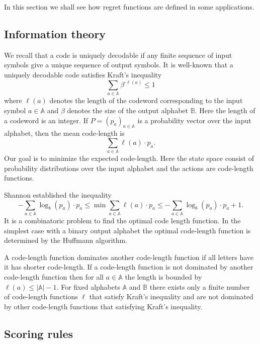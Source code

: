 \documentclass[10pt,a4paper,draft]{article}
\begin{document}
In this section we shall see how regret functions are defined in some applications.

\subsection{Information theory}

We recall that a code is uniquely decodable if any finite
sequence of input symbols give a unique sequence of output symbols. It is
well-known that a uniquely decodable code satisfies Kraft's inequality 
\begin{equation}
\sum_{a\in\mathbb{A}}\beta^{\textrm{-}\ell\left(a\right)}\leq1\label{eq:Kraft}
\end{equation}
where $\ell\left(a\right)$ denotes the length of the codeword
corresponding to the input symbol $a\in\mathbb{A}$ and $\beta$ denotes the
size of the output alphabet $\mathbb{B}$. Here the length of a codeword is an integer. If $P=\left(p_{a}\right)_{a\in\mathbb{A}}$ is a probability vector over the input alphabet, then the mean
code-length is 
\[
\sum_{a\in\mathbb{A}}\ell\left(a\right)\cdot p_{a}.
\]
Our goal is to minimize the expected code-length. Here the state
space consist of probability distributions over the input
alphabet and the actions are code-length functions.

Shannon established the inequality 
\[
-\sum_{a\in\mathbb{A}}\log_{b}\left(p_{a}\right)\cdot
p_{a}\leq\min\sum_{a\in\mathbb{A}}\ell\left(a\right)\cdot
p_{a}\leq-\sum_{a\in\mathbb{A}}\log_{b}\left(p_{a}\right)\cdot
p_{a}+1.
\]
It is a combinatoric problem to find the optimal code length
function. In the simplest case with a binary output alphabet the optimal
code-length function is determined by the Huffmann algorithm.

A code-length function dominates another code-length function if all letters have  it has shorter code-length. If a code-length function is not dominated by another
code-length function then for all $a\in\mathbb{A}$ the length is bounded by
$\ell\left(a\right)\leq\left|\mathbb{A}\right|-1.$
 For fixed alphabets $\mathbb{A}$ and $\mathbb{B}$
there exists only a finite number of code-length functions $\ell$ that satisfy Kraft's inequality and are not dominated by other
code-length functions that satisfying Kraft's inequality.

\subsection{Scoring rules}
\end{document}
